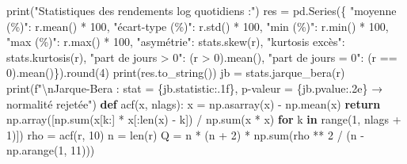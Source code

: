 \documentclass[
  10pt,
]{article}
\newenvironment{Shaded}{}{}
\newcommand{\BuiltInTok}[1]{\textcolor[rgb]{0.00,0.50,0.00}{#1}}
\newcommand{\CharTok}[1]{\textcolor[rgb]{0.25,0.44,0.63}{#1}}
\newcommand{\ControlFlowTok}[1]{\textcolor[rgb]{0.00,0.44,0.13}{\textbf{#1}}}
\newcommand{\DecValTok}[1]{\textcolor[rgb]{0.25,0.63,0.44}{#1}}
\newcommand{\KeywordTok}[1]{\textcolor[rgb]{0.00,0.44,0.13}{\textbf{#1}}}
\newcommand{\NormalTok}[1]{#1}
\newcommand{\OperatorTok}[1]{\textcolor[rgb]{0.40,0.40,0.40}{#1}}
\newcommand{\SpecialCharTok}[1]{\textcolor[rgb]{0.25,0.44,0.63}{#1}}
\newcommand{\SpecialStringTok}[1]{\textcolor[rgb]{0.73,0.40,0.53}{#1}}
\newcommand{\StringTok}[1]{\textcolor[rgb]{0.25,0.44,0.63}{#1}}
\begin{document}
\begin{Shaded}
\begin{Highlighting}[]
\BuiltInTok{print}\NormalTok{(}\StringTok{"Statistiques des rendements log quotidiens :"}\NormalTok{)}
\NormalTok{res }\OperatorTok{=}\NormalTok{ pd.Series(\{}
    \StringTok{"moyenne (\%)"}\NormalTok{: r.mean() }\OperatorTok{*} \DecValTok{100}\NormalTok{, }\StringTok{"écart{-}type (\%)"}\NormalTok{: r.std() }\OperatorTok{*} \DecValTok{100}\NormalTok{,}
    \StringTok{"min (\%)"}\NormalTok{: r.}\BuiltInTok{min}\NormalTok{() }\OperatorTok{*} \DecValTok{100}\NormalTok{, }\StringTok{"max (\%)"}\NormalTok{: r.}\BuiltInTok{max}\NormalTok{() }\OperatorTok{*} \DecValTok{100}\NormalTok{,}
    \StringTok{"asymétrie"}\NormalTok{: stats.skew(r), }\StringTok{"kurtosis excès"}\NormalTok{: stats.kurtosis(r),}
    \StringTok{"part de jours \textgreater{} 0"}\NormalTok{: (r }\OperatorTok{\textgreater{}} \DecValTok{0}\NormalTok{).mean(), }\StringTok{"part de jours = 0"}\NormalTok{: (r }\OperatorTok{==} \DecValTok{0}\NormalTok{).mean()\}).}\BuiltInTok{round}\NormalTok{(}\DecValTok{4}\NormalTok{)}
\BuiltInTok{print}\NormalTok{(res.to\_string())}
\NormalTok{jb }\OperatorTok{=}\NormalTok{ stats.jarque\_bera(r)}
\BuiltInTok{print}\NormalTok{(}\SpecialStringTok{f"}\CharTok{\textbackslash{}n}\SpecialStringTok{Jarque{-}Bera : stat = }\SpecialCharTok{\{}\NormalTok{jb}\SpecialCharTok{.}\NormalTok{statistic}\SpecialCharTok{:.1f\}}\SpecialStringTok{, p{-}valeur = }\SpecialCharTok{\{}\NormalTok{jb}\SpecialCharTok{.}\NormalTok{pvalue}\SpecialCharTok{:.2e\}}\SpecialStringTok{  → normalité rejetée"}\NormalTok{)}
\KeywordTok{def}\NormalTok{ acf(x, nlags):}
\NormalTok{    x }\OperatorTok{=}\NormalTok{ np.asarray(x) }\OperatorTok{{-}}\NormalTok{ np.mean(x)}
    \ControlFlowTok{return}\NormalTok{ np.array([np.}\BuiltInTok{sum}\NormalTok{(x[k:] }\OperatorTok{*}\NormalTok{ x[:}\BuiltInTok{len}\NormalTok{(x) }\OperatorTok{{-}}\NormalTok{ k]) }\OperatorTok{/}\NormalTok{ np.}\BuiltInTok{sum}\NormalTok{(x }\OperatorTok{*}\NormalTok{ x) }\ControlFlowTok{for}\NormalTok{ k }\KeywordTok{in} \BuiltInTok{range}\NormalTok{(}\DecValTok{1}\NormalTok{, nlags }\OperatorTok{+} \DecValTok{1}\NormalTok{)])}
\NormalTok{rho }\OperatorTok{=}\NormalTok{ acf(r, }\DecValTok{10}\NormalTok{)}
\NormalTok{n }\OperatorTok{=} \BuiltInTok{len}\NormalTok{(r)}
\NormalTok{Q }\OperatorTok{=}\NormalTok{ n }\OperatorTok{*}\NormalTok{ (n }\OperatorTok{+} \DecValTok{2}\NormalTok{) }\OperatorTok{*}\NormalTok{ np.}\BuiltInTok{sum}\NormalTok{(rho }\OperatorTok{**} \DecValTok{2} \OperatorTok{/}\NormalTok{ (n }\OperatorTok{{-}}\NormalTok{ np.arange(}\DecValTok{1}\NormalTok{, }\DecValTok{11}\NormalTok{)))}

\end{Highlighting}
\end{Shaded}
\end{document}
